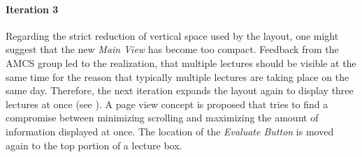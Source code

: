 \paragraph{Iteration 3}
Regarding the strict reduction of vertical space used by the layout, one might suggest that the new \emph{Main View} has become too compact.
Feedback from the AMCS group led to the realization, that multiple lectures should be visible at the same time for the reason that typically multiple lectures are taking place on the same day.
Therefore, the next iteration expands the layout again to display three lectures at once (see ). A page view concept is proposed that tries to find a compromise between minimizing scrolling and maximizing the amount of information displayed at once. The location of the \emph{Evaluate Button} is moved again to the top portion of a lecture box.
